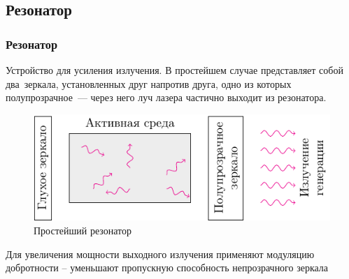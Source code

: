 \documentclass[10pt,pdf,hyperref={unicode}, dvipsnames]{beamer}
\newcommand\frametitless[1]{\subsection{#1}\frametitle{#1}}
\begin{document}
\begin{frame}[t]
	\frametitless{Резонатор}

	Устройство для усиления излучения.
	В простейшем случае представляет собой два зеркала, установленных друг напротив друга, одно из которых полупрозрачное — через него луч лазера частично выходит из резонатора.

	\begin{figure}[h]
		\centering
		\includegraphics[]{images/resonator}
		\caption{Простейший резонатор}
	\end{figure}	

	Для увеличения мощности выходного излучения применяют модуляцию добротности – уменьшают пропускную способность непрозрачного зеркала
\end{frame}
\end{document}
